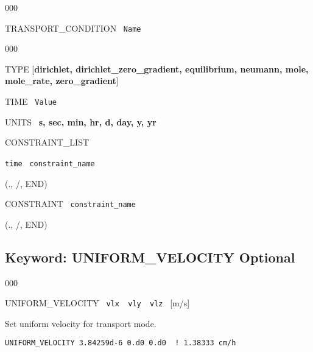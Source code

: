 \documentclass[12pt]{article}
\begin{document}
\begin{deflist}{000}
\item[TRANSPORT\_CONDITION] \ {\tt Name}

\begin{deflist}{000}
\item[TYPE] [{\bf dirichlet, dirichlet\_zero\_gradient, equilibrium, neumann, mole, mole\_rate, \linebreak zero\_gradient}]
\item[TIME] \ {\tt Value}
\item[UNITS] \ {\bf s, sec, min, hr, d, day, y, yr}
\item[CONSTRAINT\_LIST]
\item {\tt time} \ {\tt constraint\_name}
\item[(., /, END)]
\item[CONSTRAINT] \ {\tt constraint\_name}
\end{deflist}
\item[(., /, END)]
\end{deflist}




\newpage
\protect\hypertarget{target_unifvel}{}

\subsection{Keyword: UNIFORM\_VELOCITY \hfill Optional}


\begin{deflist}{000}
\item[UNIFORM\_VELOCITY] \ {\tt vlx \ vly \ vlz} \ [m/s]
\end{deflist}

 Set uniform velocity for transport mode.

\begin{verbatim}
UNIFORM_VELOCITY 3.84259d-6 0.d0 0.d0  ! 1.38333 cm/h
\end{verbatim}


\newpage
\protect\hypertarget{target_touch}{}
\end{document}
